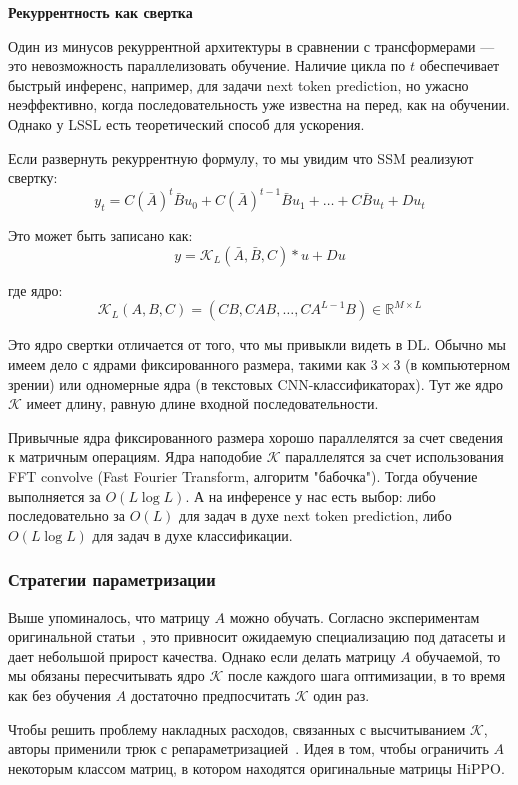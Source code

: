 \documentclass[11pt]{extarticle}
\begin{document}
\textbf{Рекуррентность как свертка}

Один из минусов рекуррентной архитектуры в сравнении с трансформерами --- это невозможность параллелизовать обучение. Наличие цикла по $t$ обеспечивает быстрый инференс, например, для задачи next token prediction, но ужасно неэффективно, когда последовательность уже известна на перед, как на обучении. Однако у LSSL есть теоретический способ для ускорения.

Если развернуть рекуррентную формулу, то мы увидим что SSM реализуют свертку:
$$y_t = C(\bar{A})^t\bar{B}u_0 + C(\bar{A})^{t-1}\bar{B}u_1 + \ldots + C\bar{B}u_t+Du_t$$

Это может быть записано как:
$$y = \mathcal{K}_L(\bar{A}, \bar{B}, C) * u + Du$$

где ядро:
$$\mathcal{K}_L(A, B, C) = (CB, CAB, \ldots, CA^{L-1}B) \in \mathbb{R}^{M \times L}$$

Это ядро свертки отличается от того, что мы привыкли видеть в DL. Обычно мы имеем дело с ядрами фиксированного размера, такими как $3\times 3$ (в компьютерном зрении) или одномерные ядра (в текстовых CNN-классификаторах). Тут же ядро $\mathcal{K}$ имеет длину, равную длине входной последовательности.

Привычные ядра фиксированного размера хорошо параллелятся за счет сведения к матричным операциям. Ядра наподобие $\mathcal{K}$ параллелятся за счет использования FFT convolve (Fast Fourier Transform, алгоритм "бабочка"). Тогда обучение выполняется за $O(L \log L)$. А на инференсе у нас есть выбор: либо последовательно за $O(L)$ для задач в духе next token prediction, либо $O(L\log L)$ для задач в духе классификации.

\subsubsection{Стратегии параметризации}

Выше упоминалось, что матрицу $A$ можно обучать. Согласно экспериментам оригинальной статьи~\cite{gu2021combiningrecurrentconvolutionalcontinuoustime}, это привносит ожидаемую специализацию под датасеты и дает небольшой прирост качества. Однако если делать матрицу $A$ обучаемой, то мы обязаны пересчитывать ядро $\mathcal{K}$ после каждого шага оптимизации, в то время как без обучения $A$ достаточно предпосчитать $\mathcal{K}$ один раз.

Чтобы решить проблему накладных расходов, связанных с высчитыванием $\mathcal{K}$, авторы применили трюк с репараметризацией~\cite{gu2021combiningrecurrentconvolutionalcontinuoustime}. Идея в том, чтобы ограничить $A$ некоторым классом матриц, в котором находятся оригинальные матрицы HiPPO.
\end{document}
